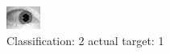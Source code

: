 \begin{figure}[h!]
\begin{center}
\includegraphics[width=0.60\columnwidth]{figures/ID1564_class_2_target_1.png}
\end{center}
\caption{ Classification: 2 actual target: 1}
\label{fig:ID1564_class_2_target_1}
\end{figure}
